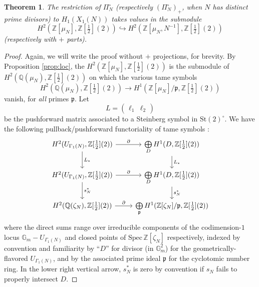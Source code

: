\documentclass[10pt]{amsart}
\newtheorem{thm}{Theorem}[section]
\theoremstyle{definition}
\newcommand{\Z}{\mathbb{Z}}
\newcommand{\Q}{\mathbb{Q}}
\newcommand{\St}{\mathrm{St}}
\numberwithin{equation}{section}
\begin{document}
    \begin{thm}
        The restriction of $\Pi_N^\circ$ (respectively $(\Pi_N^\circ)_+$, when $N$ has distinct prime divisors) to $H_1(X_1(N))$ takes values in the submodule
        \[
        H^2(\Z[\mu_N],\Z[\tfrac{1}{2}](2)) \hookrightarrow H^2(\Z[\mu_N, N^{-1}],\Z[\tfrac{1}{2}](2)) 
        \]
        (respectively with $+$ parts).
    \end{thm}
    \begin{proof}
        Again, we will write the proof without $+$ projections, for brevity. By Proposition \ref{prop:loc}, the $H^2(\Z[\mu_N],\Z[\tfrac{1}{2}](2))$ is the submodule of $H^2(\Q(\mu_N),\Z[\tfrac{1}{2}](2))$ on which the various tame symbols
        \[
        H^2(\Q(\mu_N),\Z[\tfrac{1}{2}](2)) \to H^1(\Z[\mu_N]/\mathfrak{p}, \Z[\tfrac{1}{2}](2))
        \]
        vanish, for \emph{all} primes $\mathfrak{p}$. Let 
        \[
        L=\begin{pmatrix} \ell_1 & \ell_2 \end{pmatrix}
        \]
        be the pushforward matrix associated to a Steinberg symbol in $\St(2)^\circ$. We have the following pullback/pushforward functoriality of tame symbols \cite{Lev2}:
        \begin{equation}
        \begin{tikzcd}
            H^2(U_{\Gamma_1(N)},\Z[\tfrac{1}{2}](2)) \arrow[d,"L_*"] \arrow[r, "\partial"] &\bigoplus\limits_{D} H^1(D, \Z[\tfrac{1}{2}](2))\arrow[d,"L_*"] \\
            H^2(U_{\Gamma_1(N)},\Z[\tfrac{1}{2}](2)) \arrow[d,"s_N^*"] \arrow[r, "\partial"] &\bigoplus\limits_{D} H^1(D, \Z[\tfrac{1}{2}](2))\arrow[d,"s_N^*"] \\
            H^2(\Q(\zeta_N),\Z[\tfrac{1}{2}](2)) \arrow[r, "\partial"] &\bigoplus\limits_{\mathfrak{p}} H^1(\Z[\zeta_N]/\mathfrak{p}, \Z[\tfrac{1}{2}](2))
        \end{tikzcd}
        \end{equation}
        where the direct sums range over irreducible components of the codimension-$1$ locus $\mathbb{G}_m-U_{\Gamma_1(N)}$ and closed points of $\mathrm{Spec}\,\Z[\zeta_N]$ respectively, indexed by convention and familiarity by ``$D$'' for divisor (in $\mathbb{G}_m^2$) for the geometrically-flavored $U_{\Gamma_1(N)}$, and by the associated prime ideal $\mathfrak{p}$ for the cyclotomic number ring. In the lower right vertical arrow, $s_N^*$ is zero by convention if $s_N$ fails to properly intersect $D$. 


\end{proof}
\end{document}
